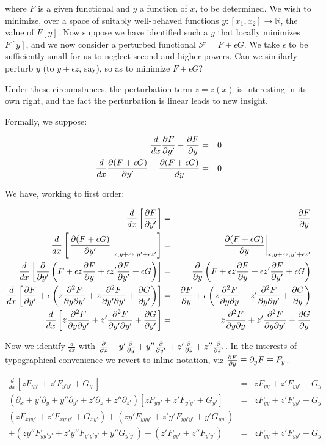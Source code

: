 \documentclass[pdflatex,sn-mathphys-num]{sn-jnl}%
\theoremstyle{thmstyleone}%
\theoremstyle{thmstyletwo}%
\theoremstyle{thmstylethree}%
\begin{document}
\noindent where $F$ is a given functional and $y$ a function of $x$,
to be determined.  We wish to minimize, over a space of suitably
well-behaved functions
$y\colon\left[x_1,x_2\right]\longrightarrow\mathbb{R}$, the value of
$F[y]$.  Now suppose we have identified such a $y$ that locally
minimizes $F[y]$, and we now consider a perturbed functional
$\mathcal{F}=F+\epsilon G$.  We take $\epsilon$ to be sufficiently
small for us to neglect second and higher powers.  Can we similarly
perturb $y$ (to $y+\epsilon z$, say), so as to minimize $F+\epsilon
G$?

Under these circumstances, the perturbation term $z=z(x)$ is
interesting in its own right, and the fact the perturbation is linear
leads to new insight.

Formally, we suppose:

\begin{eqnarray}
  \frac{d}{dx}\frac{\partial{F}}{\partial{y'}}-\frac{\partial{F}}{\partial{y}} &=& 0\nonumber\\
  \frac{d}{dx}\frac{\partial{(F+\epsilon G)}}{\partial{y'}}-\frac{\partial{(F+\epsilon G)}}{\partial{y}} &=& 0
\end{eqnarray}

We have, working to first order:

\begin{eqnarray}
\frac{d}{dx}\left[\frac{\partial{F}}{\partial{y'}}\right]
&=& \frac{\partial{F}}{\partial{y}}\nonumber\\
\frac{d}{dx}\left[\left.\frac{\partial{(F+\epsilon G)}}{\partial{y'}}\right|_{x,y+\epsilon z,y'+\epsilon z'}\right]
&=& \left.\frac{\partial{(F+\epsilon G)}}{\partial{y}}\right|_{x,y+\epsilon z,y'+\epsilon z'}\nonumber\\
\frac{d}{dx}\left[\frac{\partial{}}{\partial{y'}}\left(F + \epsilon z\frac{\partial{F}}{\partial{y}} + \epsilon z'\frac{\partial{F}}{\partial{y'}}+\epsilon G\right)\right]
&=& \frac{\partial{}}{\partial{y}}\left(F + \epsilon z\frac{\partial{F}}{\partial{y}} + \epsilon z'\frac{\partial{F}}{\partial{y'}}+\epsilon G\right)\nonumber\\
\frac{d}{dx}\left[\frac{\partial{F}}{\partial{y'}} + \epsilon\left(z\frac{\partial^2{F}}{\partial{y}\partial{y'}} + z\frac{\partial^2{F}}{\partial{y'}\partial{y'}} + \frac{\partial{G}}{\partial{y'}}\right)\right]
&=& \frac{\partial{F}}{\partial{y}} + \epsilon\left(z\frac{\partial^2{F}}{\partial{y}\partial{y}} + z'\frac{\partial^2{F}}{\partial{y}\partial{y'}} + \frac{\partial{G}}{\partial{y}}\right)\nonumber\\
\frac{d}{dx}\left[z\frac{\partial^2{F}}{\partial{y}\partial{y'}} + z'\frac{\partial^2{F}}{\partial{y'}\partial{y'}} + \frac{\partial{G}}{\partial{y'}}\right]
&=& z\frac{\partial^2{F}}{\partial{y}\partial{y}} + z'\frac{\partial^2{F}}{\partial{y}\partial{y'}} + \frac{\partial{G}}{\partial{y}}
\end{eqnarray}

Now we identify $\frac{d}{dx}$ with $\frac{\partial{}}{\partial{x}} + y'\frac{\partial{}}{\partial{y}} +
y''\frac{\partial{}}{\partial{y'}} + z'\frac{\partial{}}{\partial{z}} + z''\frac{\partial{}}{\partial{z'}}$.  In the interests of
typographical convenience we revert to inline notation, viz
$\frac{\partial{F}}{\partial{y}}\equiv\partial_yF\equiv F_y$.


\begin{eqnarray}
\frac{d}{dx}\left[zF_{yy'} + z'F_{y'y'} + G_{y'}\right]
&=& zF_{yy} + z'F_{yy'} + G_{y}\nonumber\\
\left(\partial_{x} + y'\partial_{y} + y''\partial_{y'} + z'\partial_{z} + z''\partial_{z'}\right)
\left[zF_{yy'} + z'F_{y'y'} + G_{y'}\right]
&=& zF_{yy} + z'F_{yy'} + G_{y}\nonumber\\
(zF_{xyy'} + z'F_{xy'y'} + G_{xy'})
+ (zy'F_{yyy'} + z'y'F_{yy'y'} + y'G_{yy'})\nonumber\\
+ ( zy''F_{yy'y'} + z'y''F_{y'y'y'} + y''G_{y'y'})
+ (z'F_{yy'} + z''F_{y'y'})
&=& zF_{yy} + z'F_{yy'} + G_{y}\nonumber\\
\end{eqnarray}
\end{document}
